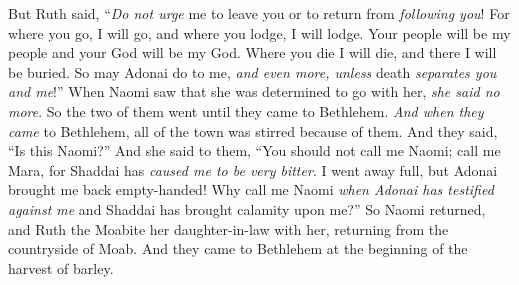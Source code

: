 \begin{biblechapter}
\verse But Ruth said, “\textit{Do not urge} me to leave you or to return from \textit{following you}! For where you go, I will go, and where you lodge, I will lodge. Your people will be my people and your God will be my God.
\verse Where you die I will die, and there I will be buried. So may Adonai do to me, \textit{and even more, unless} death \textit{separates you and me}!”
\verse When Naomi saw that she was determined to go with her, \textit{she said no more}.
\verse So the two of them went until they came to Bethlehem. \textit{And when they came} to Bethlehem, all of the town was stirred because of them. And they said, “Is this Naomi?”
\verse And she said to them, “You should not call me Naomi; call me Mara, for Shaddai has \textit{caused me to be very bitter}.
\verse I went away full, but Adonai brought me back empty-handed! Why call me Naomi \textit{when Adonai has testified against me} and Shaddai has brought calamity upon me?”
\verse So Naomi returned, and Ruth the Moabite her daughter-in-law with her, returning from the countryside of Moab. And they came to Bethlehem at the beginning of the harvest of barley.
\end{biblechapter}

